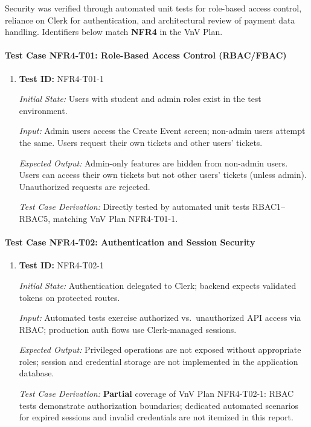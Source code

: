 \documentclass[12pt, titlepage]{article}
\begin{document}
Security was verified through automated unit tests for role-based access control, reliance on Clerk for authentication, and architectural review of payment data handling. Identifiers below match \textbf{NFR4} in the VnV Plan.

\paragraph{Test Case NFR4-T01: Role-Based Access Control (RBAC/FBAC)}

\begin{enumerate}

\item \textbf{Test ID:} NFR4-T01-1

\textit{Initial State:} Users with student and admin roles exist in the test environment.

\textit{Input:} Admin users access the Create Event screen; non-admin users attempt the same. Users request their own tickets and other users' tickets.

\textit{Expected Output:} Admin-only features are hidden from non-admin users. Users can access their own tickets but not other users' tickets (unless admin). Unauthorized requests are rejected.

\textit{Test Case Derivation:} Directly tested by automated unit tests RBAC1--RBAC5, matching VnV Plan NFR4-T01-1.

\end{enumerate}


\paragraph{Test Case NFR4-T02: Authentication and Session Security}

\begin{enumerate}

\item \textbf{Test ID:} NFR4-T02-1

\textit{Initial State:} Authentication delegated to Clerk; backend expects validated tokens on protected routes.

\textit{Input:} Automated tests exercise authorized vs.\ unauthorized API access via RBAC; production auth flows use Clerk-managed sessions.

\textit{Expected Output:} Privileged operations are not exposed without appropriate roles; session and credential storage are not implemented in the application database.

\textit{Test Case Derivation:} \textbf{Partial} coverage of VnV Plan NFR4-T02-1: RBAC tests demonstrate authorization boundaries; dedicated automated scenarios for expired sessions and invalid credentials are not itemized in this report.

\end{enumerate}
\end{document}

